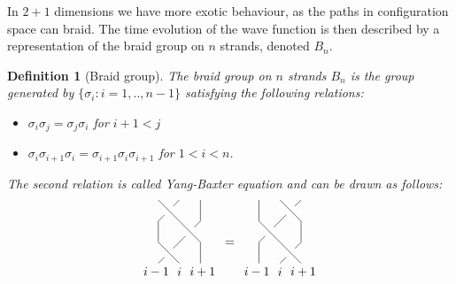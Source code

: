 \documentclass{article}
\newtheorem{definition}{Definition}
\begin{document}
In $2+1$ dimensions we have more exotic behaviour, as the paths in configuration space can braid. The time evolution of the wave function is then described by a representation of the braid group on $n$ strands, denoted $B_n$.
\begin{definition}[Braid group]
	The braid group on $n$ strands $B_n$ is the group generated by $\{ \sigma_i: i=1,..,n-1\}$  satisfying the following relations:
	\begin{itemize}
		\item $\sigma_i \sigma_j = \sigma_j \sigma_i$ for $i+1 < j$
		\item $ \sigma_i \sigma_{i+1} \sigma_i = \sigma_{i+1} \sigma_i \sigma_{i+1}$ for $1 < i < n$.
	\end{itemize}
	The second relation is called Yang-Baxter equation and can be drawn as follows:
	\begin{equation}
	\begin{gathered}
	\begin{tikzpicture}[scale=0.6]
	\node (0) at (0.5,0.5) {};
	\node (1) at (-0.1,-0.4) {$i-1$};
	\node (2) at (1,-0.4) {$i$};
	\node (3) at (2.1,-0.4) {$i+1$};
	\node (4) at (1.5,1.5) {};
	\node (5) at (0.5,2.5) {};
	\draw (0,0)--(0)--(1,1)--(4)--(2,2)--(2,3);
	\draw (1,0)--(0,1)--(0,2)--(5)--(1,3);
	\draw (2,0)--(2,1)--(0,3);
	\end{tikzpicture}
	\end{gathered}
	\, = \,
	\begin{gathered}
	\begin{tikzpicture}[scale=0.6]
	\node (0) at (1.5,0.5) {};
	\node (1) at (-0.1,-0.4) {$i-1$};
	\node (2) at (1,-0.4) {$i$};
	\node (3) at (2.1,-0.4) {$i+1$};
	\node (4) at (0.5,1.5) {};
	\node (5) at (1.5,2.5) {};
	\draw (2,0)--(1,1)--(0,2)--(0,3);
	\draw (1,0)--(0)--(2,1)--(2,2)--(1,3);
	\draw (0,0)--(0,1)--(4)--(5)--(2,3);
	\end{tikzpicture}
	\end{gathered}
	\end{equation}
\end{definition}
\end{document}

